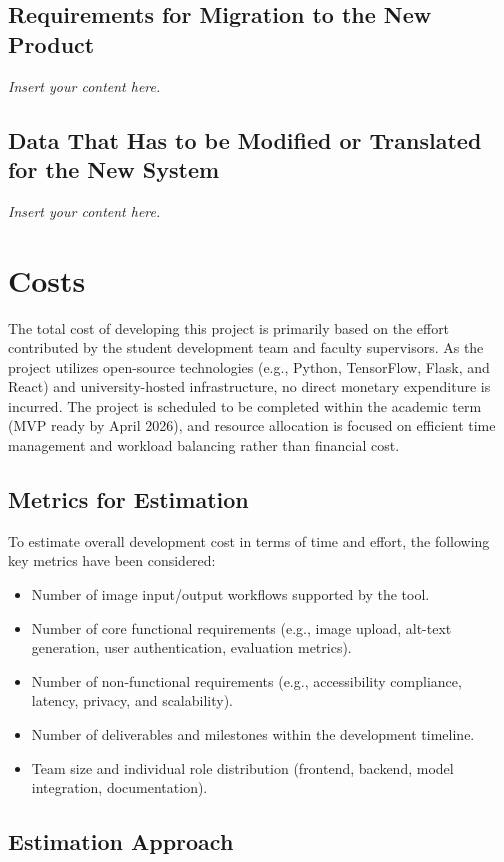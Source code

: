 \documentclass[12pt]{article}
\newcommand{\lips}{\textit{Insert your content here.}}
\begin{document}
\subsection{Requirements for Migration to the New Product}
\lips
\subsection{Data That Has to be Modified or Translated for the New System}
\lips

\section{Costs}

The total cost of developing this project is primarily based on the effort contributed by the student development team and faculty supervisors. As the project utilizes open-source technologies (e.g., Python, TensorFlow, Flask, and React) and university-hosted infrastructure, no direct monetary expenditure is incurred. The project is scheduled to be completed within the academic term (MVP ready by April 2026), and resource allocation is focused on efficient time management and workload balancing rather than financial cost.

\subsection{Metrics for Estimation}

To estimate overall development cost in terms of time and effort, the following key metrics have been considered:
\begin{itemize}
    \item Number of image input/output workflows supported by the tool.
    \item Number of core functional requirements (e.g., image upload, alt-text generation, user authentication, evaluation metrics).
    \item Number of non-functional requirements (e.g., accessibility compliance, latency, privacy, and scalability).
    \item Number of deliverables and milestones within the development timeline.
    \item Team size and individual role distribution (frontend, backend, model integration, documentation).
\end{itemize}

\subsection{Estimation Approach}
\end{document}
